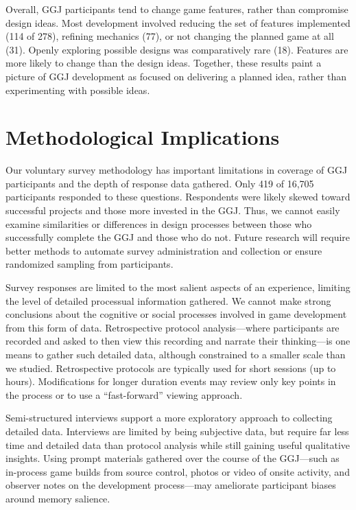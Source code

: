 \documentclass{sig-alternate}
\begin{document}
Overall, GGJ participants tend to change game features, rather than compromise design ideas. Most development involved reducing the set of features implemented (114 of 278), refining mechanics (77), or not changing the planned game at all (31). Openly exploring possible designs was comparatively rare (18). Features are more likely to change than the design ideas. Together, these results paint a picture of GGJ development as focused on delivering a planned idea, rather than experimenting with possible ideas.

\section{Methodological Implications}
Our voluntary survey methodology has important limitations in coverage of GGJ participants and the depth of response data gathered. Only 419 of 16,705 participants responded to these questions. Respondents were likely skewed toward successful projects and those more invested in the GGJ. Thus, we cannot easily examine similarities or differences in design processes between those who successfully complete the GGJ and those who do not. Future research will require better methods to automate survey administration and collection or ensure randomized sampling from participants.

Survey responses are limited to the most salient aspects of an experience, limiting the level of detailed processual information gathered. We cannot make strong conclusions about the cognitive or social processes involved in game development from this form of data. Retrospective protocol analysis---where participants are recorded and asked to then view this recording and narrate their thinking---is one means to gather such detailed data, although constrained to a smaller scale than we studied. Retrospective protocols are typically used for short sessions (up to hours). Modifications for longer duration events may review only key points in the process or to use a ``fast-forward'' viewing approach. 

Semi-structured interviews support a more exploratory approach to collecting detailed data. Interviews are limited by being subjective data, but require far less time and detailed data than protocol analysis while still gaining useful qualitative insights. Using prompt materials gathered over the course of the GGJ---such as in-process game builds from source control, photos or video of onsite activity, and observer notes on the development process---may ameliorate participant biases around memory salience.
\end{document}

